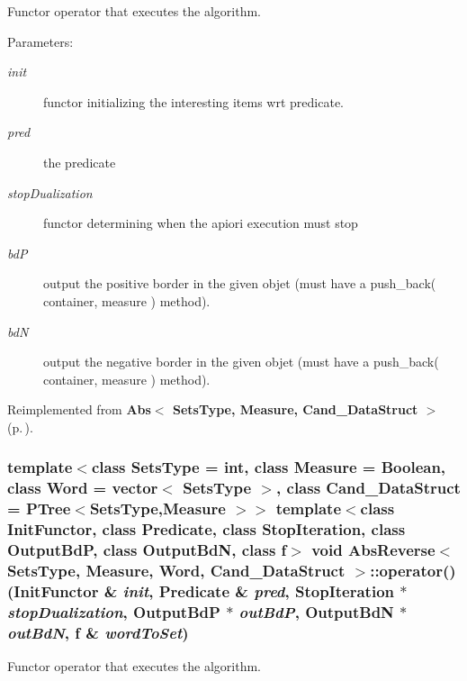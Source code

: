 Functor operator that executes the algorithm. 

\begin{Desc}
\item[Parameters:]
\begin{description}
\item[{\em init}]functor initializing the interesting items wrt predicate. \item[{\em pred}]the predicate \item[{\em stop\-Dualization}]functor determining when the apiori execution must stop \item[{\em bd\-P}]output the positive border in the given objet (must have a push\_\-back( container, measure ) method). \item[{\em bd\-N}]output the negative border in the given objet (must have a push\_\-back( container, measure ) method). \end{description}
\end{Desc}


Reimplemented from {\bf Abs$<$ Sets\-Type, Measure, Cand\_\-Data\-Struct $>$} {\rm (p.\,\pageref{class_abs_1cb8186e971cbb42b54d29bab5ba1e01})}.
\subsubsection{\setlength{\rightskip}{0pt plus 5cm}template$<$class Sets\-Type = int, class Measure = Boolean, class Word = vector$<$ Sets\-Type $>$, class Cand\_\-Data\-Struct = PTree$<$Sets\-Type,Measure $>$$>$ template$<$class Init\-Functor, class Predicate, class Stop\-Iteration, class Output\-Bd\-P, class Output\-Bd\-N, class f$>$ void {\bf Abs\-Reverse}$<$ Sets\-Type, Measure, Word, Cand\_\-Data\-Struct $>$::operator() (Init\-Functor \& {\em init}, {\bf Predicate} \& {\em pred}, Stop\-Iteration $\ast$ {\em stop\-Dualization}, Output\-Bd\-P $\ast$ {\em out\-Bd\-P}, Output\-Bd\-N $\ast$ {\em out\-Bd\-N}, f \& {\em word\-To\-Set})\hspace{0.3cm}{\tt  [inline]}}\label{class_abs_reverse_d4e6aa7d0f2e50db5d5e75ab5801fd51}


Functor operator that executes the algorithm. 

